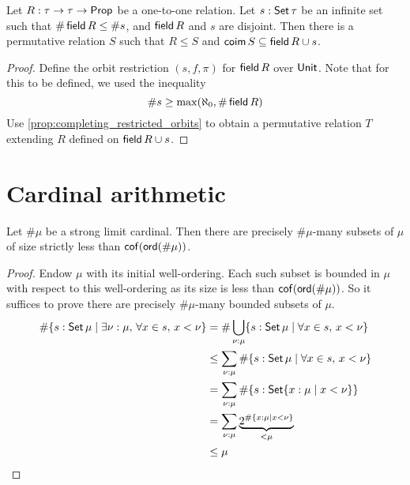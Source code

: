 \begin{proposition}
  \label{prop:completing_orbits}
  Let \( R : \tau \to \tau \to \mathsf{Prop} \) be a one-to-one relation.
  Let \( s : \operatorname{\mathsf{Set}} \tau \) be an infinite set such that \( \#\operatorname{\mathsf{field}} R \leq \#s \), and \( \operatorname{\mathsf{field}} R \) and \( s \) are disjoint.
  Then there is a permutative relation \( S \) such that \( R \leq S \) and \( \operatorname{\mathsf{coim}} S \subseteq \operatorname{\mathsf{field}} R \cup s \).
\end{proposition}
\begin{proof}
  Define the orbit restriction \( (s, f, \pi) \) for \( \operatorname{\mathsf{field}} R \) over \( \mathsf{Unit} \).
  Note that for this to be defined, we used the inequality
  \[ \#s \geq \max(\aleph_0, \#\operatorname{\mathsf{field}} R) \]
  Use \cref{prop:completing_restricted_orbits} to obtain a permutative relation \( T \) extending \( R \) defined on \( \operatorname{\mathsf{field}} R \cup s \).
\end{proof}

\section{Cardinal arithmetic}

\begin{lemma-no-bp}[mathlib]
  \label{prop:mk_subset_mk_lt_cof}
  Let \( \#\mu \) be a strong limit cardinal.
  Then there are precisely \( \#\mu \)-many subsets of \( \mu \) of size strictly less than \( \operatorname{\mathsf{cof}}(\operatorname{\mathsf{ord}}(\#\mu)) \).
\end{lemma-no-bp}
\begin{proof}
  Endow \( \mu \) with its initial well-ordering.
  Each such subset is bounded in \( \mu \) with respect to this well-ordering as its size is less than \( \operatorname{\mathsf{cof}}(\operatorname{\mathsf{ord}}(\#\mu)) \).
  So it suffices to prove there are precisely \( \#\mu \)-many bounded subsets of \( \mu \).
  \begin{align*}
    \#\{ s : \operatorname{\mathsf{Set}} \mu \mid \exists \nu : \mu,\, \forall x \in s,\, x < \nu \}
    &= \#\bigcup_{\nu : \mu} \{ s : \operatorname{\mathsf{Set}} \mu \mid \forall x \in s,\, x < \nu \} \\
    &\leq \sum_{\nu : \mu} \#\{ s : \operatorname{\mathsf{Set}} \mu \mid \forall x \in s,\, x < \nu \} \\
    &= \sum_{\nu : \mu} \#\{ s : \operatorname{\mathsf{Set}} \{ x : \mu \mid x < \nu \}\} \\
    &= \sum_{\nu : \mu} \underbrace{2^{\#\{ x : \mu \mid x < \nu \}}}_{<\mu} \\
    &\leq \mu
  \end{align*}
\end{proof}
